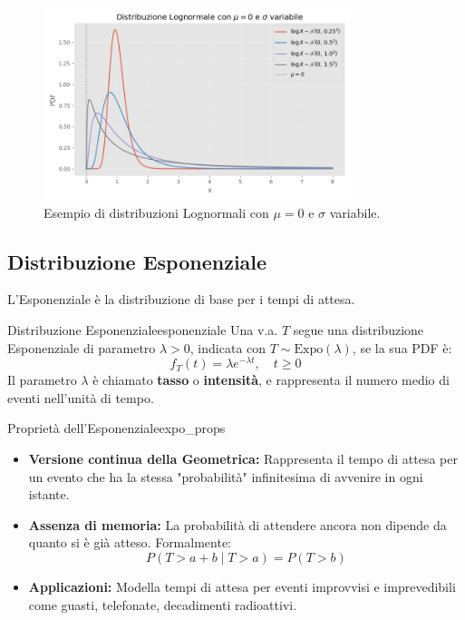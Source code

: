 \begin{figure}[H]
    \centering
    \includegraphics[width=0.8\textwidth]{images/lognormale.png}
    \caption{Esempio di distribuzioni Lognormali con \(\mu=0\) e \(\sigma\) variabile.}
    \label{fig:lognormale}
\end{figure}

\subsection{Distribuzione Esponenziale}
L'Esponenziale è la distribuzione di base per i tempi di attesa.

\begin{definizione}{Distribuzione Esponenziale}{esponenziale}
Una v.a. \(T\) segue una distribuzione Esponenziale di parametro \(\lambda > 0\), indicata con \(T \sim \text{Expo}(\lambda)\), se la sua PDF è:
\[
f_T(t) = \lambda e^{-\lambda t}, \quad t \ge 0
\]
Il parametro \(\lambda\) è chiamato \textbf{tasso} o \textbf{intensità}, e rappresenta il numero medio di eventi nell'unità di tempo.
\end{definizione}

\begin{proposizione}{Proprietà dell'Esponenziale}{expo_props}
\begin{itemize}
    \item \textbf{Versione continua della Geometrica:} Rappresenta il tempo di attesa per un evento che ha la stessa "probabilità" infinitesima di avvenire in ogni istante.
    \item \textbf{Assenza di memoria:} La probabilità di attendere ancora non dipende da quanto si è già atteso. Formalmente:
    \[ P(T > a+b \mid T > a) = P(T > b) \]
    \item \textbf{Applicazioni:} Modella tempi di attesa per eventi improvvisi e imprevedibili come guasti, telefonate, decadimenti radioattivi.
\end{itemize}
\end{proposizione}

